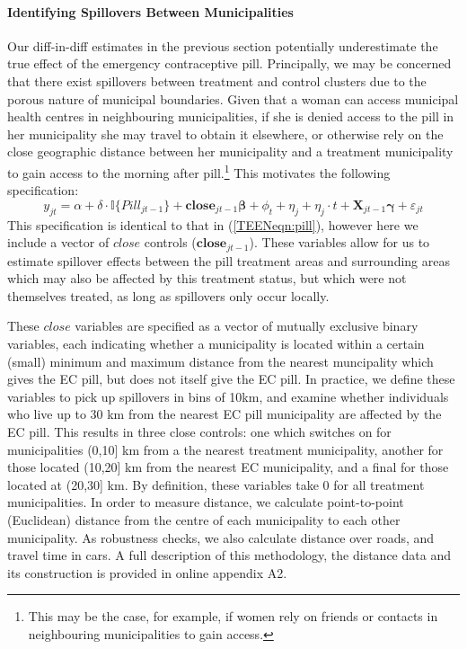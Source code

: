 \paragraph{Identifying Spillovers Between Municipalities}
\label{TEENsscn:spilloverID}
Our diff-in-diff estimates in the previous section potentially underestimate the 
true effect of the emergency contraceptive pill. Principally, we may be concerned 
that there exist spillovers between treatment and control clusters due to the 
porous nature of municipal boundaries. Given that a woman can access municipal 
health centres in neighbouring municipalities, if she is denied access to the 
pill in her municipality she may travel to obtain it elsewhere, or otherwise rely 
on the close geographic distance between her municipality and a treatment 
municipality to gain access to the morning after pill.\footnote{This may be the 
case, for example, if women rely on friends or contacts in neighbouring 
municipalities to gain access.}  This motivates the following specification:
\begin{equation}
 \label{TEENeqn:spillover}
y_{jt} = \alpha + \delta\cdot \mathbb{I}\{Pill_{jt-1}\} + 
         \bm{close}_{jt-1}\bm{\beta} + \phi_t + \eta_j + \eta_j\cdot t + 
         \bm{X}_{jt-1}\bm{\gamma} + \varepsilon_{jt}
\end{equation}
This specification is identical to that in (\ref{TEENeqn:pill}), however here we 
include a vector of $close$ controls ($\bm{close}_{jt-1}$).  These variables allow
for us to estimate spillover effects between the pill treatment areas and
surrounding areas which may also be affected by this treatment status, but which 
were not themselves treated, as long as spillovers only occur locally.  

These $close$ variables are specified as a vector of mutually exclusive binary 
variables, each indicating whether a municipality is located within a certain
(small) minimum and maximum distance from the nearest muncipality which gives
the EC pill, but does not itself give the EC pill.  In practice, we define these
variables to pick up spillovers in bins of 10km, and examine whether individuals
who live up to 30 km from the nearest EC pill municipality are affected by the
EC pill.  This results in three close controls: one which switches on for
municipalities (0,10] km from a the nearest treatment municipality, another for
those located (10,20] km from the nearest EC municipality, and a final for those
located at (20,30] km.  By definition, these variables take 0
for all treatment municipalities.  In order to measure distance, we calculate 
point-to-point (Euclidean) distance from the centre of each municipality to each 
other municipality. As robustness checks, we also calculate distance over roads, 
and travel time in cars. A full description of this methodology, the distance 
data and its construction is provided in online appendix A2.

